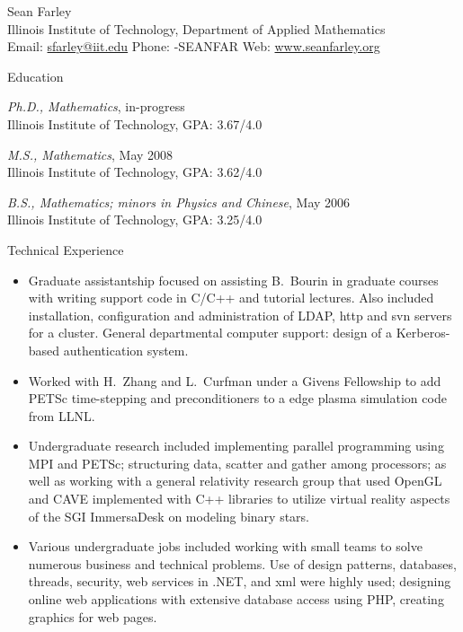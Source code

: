 \documentclass[10pt]{article}
\begin{document}
\newlength{\oldcvlabelwidth}
\newlength{\oldcvlabelsep}

\newcommand{\name}{Sean Farley}
\newcommand{\institute}{Illinois Institute of Technology}
\newcommand{\dept}{Department of Applied Mathematics}

\begin{cv}{{\large \name}\\
{\normalsize \institute, \dept\\
Email: {\mdseries \href{mailto:sfarley@iit.edu} {sfarley@iit.edu}} 
\hfill Phone: {-SEANFAR} \hfill 
Web: {\mdseries \href{http://www.seanfarley.org/} {www.seanfarley.org}}}
}

\setlength{\oldcvlabelwidth}{\cvlabelwidth}
\setlength{\oldcvlabelsep}{\cvlabelsep}

\setlength{\cvlabelwidth}{1em}

\begin{cvlist}{Education}
\item \emph{Ph.D., Mathematics}, in-progress\\
  \institute, GPA: 3.67/4.0
\item \emph{M.S., Mathematics}, May 2008\\
  \institute, GPA: 3.62/4.0
\item \emph{B.S., Mathematics; minors in Physics and Chinese}, May 2006\\
  \institute, GPA: 3.25/4.0
\end{cvlist}

\setlength{\cvlabelwidth}{0em}
\setlength{\cvlabelsep}{\labelsep}
\begin{cvlist}{Technical Experience}
\item
  \begin{itemize}\itemsep=0.25em
    \item Graduate assistantship focused on assisting B.~Bourin in graduate courses
      with writing support code in C/C++ and tutorial lectures. Also included
      installation, configuration and administration of LDAP, http and svn
      servers for a cluster. General departmental computer support: design of a
      Kerberos-based authentication system.
    \item Worked with H.~Zhang and L.~Curfman under a Givens Fellowship to add
      PETSc time-stepping and preconditioners to a edge plasma simulation code from LLNL.
    \item Undergraduate research included implementing parallel programming using MPI and PETSc;
      structuring data, scatter and gather among processors; as well as working with a general
      relativity research group that used OpenGL and CAVE implemented with C++ libraries to
      utilize virtual reality aspects of the SGI ImmersaDesk on modeling binary stars.
    \item Various undergraduate jobs included working with small teams to solve numerous business
      and technical problems. Use of design patterns, databases, threads, security, web services in .NET,
      and xml were highly used; designing online web applications with extensive database access using PHP,
      creating graphics for web pages.
  \end{itemize}
\end{cvlist}


\end{cv}
\end{document}
